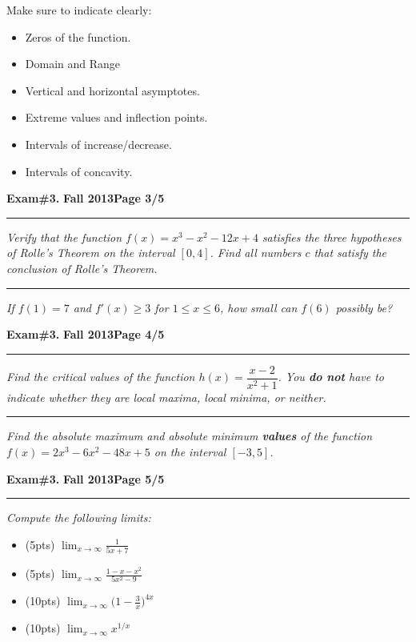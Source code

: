 \documentclass[12pt]{article}
\begin{document}
Make sure to indicate clearly:
\begin{itemize}
\item Zeros of the function.
\item Domain and Range
\item Vertical and horizontal asymptotes.
\item Extreme values and inflection points.
\item Intervals of increase/decrease.
\item Intervals of concavity.
\end{itemize}
\newpage

\hfill{\large\bf Exam\#3.}\hfill{\large\bf
  Fall 2013}\hfill{\large\bf Page 3/5}\hrule

\bigskip
{\problem[10 pts] \em Verify that the function $f(x)=x^3-x^2-12x+4$ satisfies the three hypotheses of Rolle's Theorem on the interval $[0,4]$.  Find all numbers $c$ that satisfy the conclusion of Rolle's Theorem.}

\vspace{13cm}
\hrule
{\problem[10] \em If $f(1)=7$ and $f'(x)\geq 3$ for $1\leq x \leq 6$, how small can $f(6)$ possibly be?}
\vspace{6cm}
\begin{flushright}
\end{flushright}
\newpage

\hfill{\large\bf Exam\#3.}\hfill{\large\bf
  Fall 2013}\hfill{\large\bf Page 4/5}\hrule

\bigskip
{\problem[10 pts] \em Find the critical values of the function $h(x)=\dfrac{x-2}{x^2+1}$.  You \textbf{do not} have to indicate whether they are local maxima, local minima, or neither.}

\vspace{10cm}
\hrule
{\problem[10pts] \em Find the absolute maximum and absolute minimum \textbf{values} of the function $f(x)=2x^3-6x^2-48x+5$ on the interval $[-3,5]$.}
\newpage


\hfill{\large\bf Exam\#3.}\hfill{\large\bf
  Fall 2013}\hfill{\large\bf Page 5/5}\hrule

\bigskip
{\problem \em Compute the following limits:}
\begin{itemize}
  \item[] (5pts) $\displaystyle{\lim_{x\to \infty} \frac{1}{5x+7}}$
  \vspace{3cm}
  \item[] (5pts) $\displaystyle{\lim_{x\to\infty} \frac{1-x-x^2}{5x^2-9}}$
  \vspace{3cm}
  \item[] (10pts) $\displaystyle{\lim_{x\to\infty} \Big(1-\frac{3}{x} \Big)^{4x}}$
  \vspace{6cm}
  \item[] (10pts) $\displaystyle{\lim_{x\to\infty} x^{1/x}}$
\end{itemize}
\end{document}

